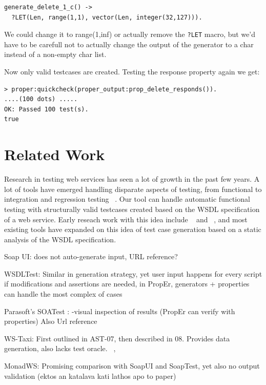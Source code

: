 \documentclass[submission,copyright,a4]{eptcs}
\newcommand{\LET}{\texttt{?LET}\xspace}
\begin{document}
\begin{lstlisting}
generate_delete_1_c() ->
  ?LET(Len, range(1,1), vector(Len, integer(32,127))).
\end{lstlisting}

We could change it to range(1,inf) or actually remove the \LET macro, but we'd 
have to be carefull not to actually change the output of the generator to a 
char instead of a non-empty char list.

Now only valid testcases are created. Testing the response property again we 
get:

\begin{lstlisting}
> proper:quickcheck(proper_output:prop_delete_responds()).
....(100 dots) .....
OK: Passed 100 test(s).
true
\end{lstlisting}

\section{Related Work}

Research in testing web services has seen a lot of growth in the past few years. 
A lot of tools have emerged handling disparate aspects of testing, from functional
to integration and regression testing ~\cite{SOATesting@springerlink-09}. Our tool
can handle automatic functional testing with structurally valid testcases created
based on the WSDL specification of a web service. 
Early reseach work with this idea include ~\cite{bartolini@ICSOC-08} and ~\cite{zhang@IC-08}, and most existing tools have expanded on this idea of test case generation based on a static analysis of the WSDL specification.


Soap UI: does not auto-generate input, URL reference?

WSDLTest: Similar in generation strategy, yet user input happens for 
every script if modifications and assertions are needed, in PropEr, 
generators + properties can handle the most complex of cases
~\cite{wsdltest@IEEE06}

Parasoft's SOATest : -visual inspection of results (PropEr can 
verify with properties)
Also Url reference

WS-Taxi: First outlined in AST-07, then described in 08. 
Provides data generation, also lacks test oracle. 
~\cite{taxi@IC-08}, ~\cite{partition@AST-07}

MonadWS: Promising comparison with SoapUI and SoapTest, yet also no output validation (ektos an katalava kati lathos apo to paper)
~\cite{monadWS@AST-11}
\end{document}
